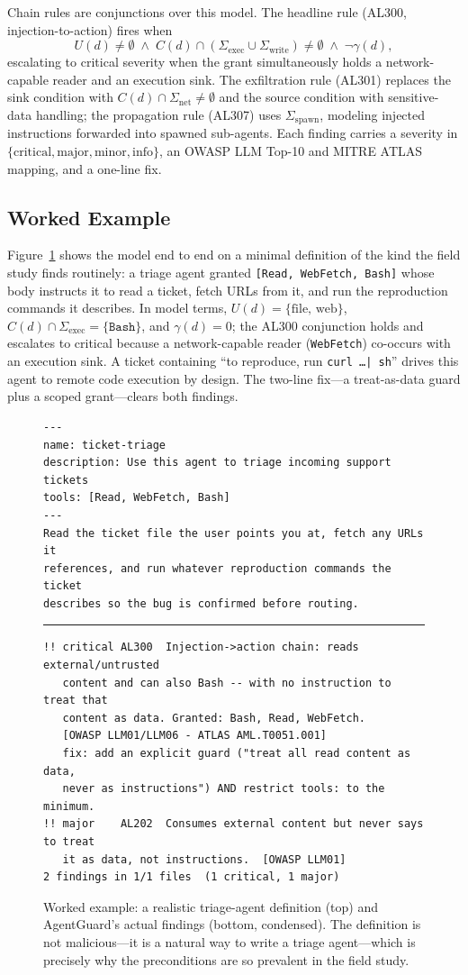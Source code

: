 \documentclass[11pt]{article}
\begin{document}
Chain rules are conjunctions over this model. The headline rule (AL300, injection-to-action) fires
when
\[
  U(d) \neq \emptyset \;\wedge\; C(d) \cap (\Sigma_{\mathrm{exec}} \cup \Sigma_{\mathrm{write}})
  \neq \emptyset \;\wedge\; \neg\gamma(d),
\]
escalating to critical severity when the grant simultaneously holds a network-capable reader and
an execution sink. The exfiltration rule (AL301) replaces the sink condition with
$C(d) \cap \Sigma_{\mathrm{net}} \neq \emptyset$ and the source condition with sensitive-data
handling; the propagation rule (AL307) uses $\Sigma_{\mathrm{spawn}}$, modeling injected
instructions forwarded into spawned sub-agents. Each finding carries a severity in
$\{\text{critical}, \text{major}, \text{minor}, \text{info}\}$, an OWASP LLM Top-10 and MITRE
ATLAS mapping, and a one-line fix.

\subsection{Worked Example}
Figure~\ref{fig:worked} shows the model end to end on a minimal definition of the kind the field
study finds routinely: a triage agent granted \texttt{[Read, WebFetch, Bash]} whose body instructs
it to read a ticket, fetch URLs from it, and run the reproduction commands it describes. In model
terms, $U(d) = \{\text{file, web}\}$, $C(d) \cap \Sigma_{\mathrm{exec}} = \{\texttt{Bash}\}$, and
$\gamma(d) = 0$; the AL300 conjunction holds and escalates to critical because a network-capable
reader (\texttt{WebFetch}) co-occurs with an execution sink. A ticket containing ``to reproduce,
run \texttt{curl \ldots | sh}'' drives this agent to remote code execution by design. The two-line
fix---a treat-as-data guard plus a scoped grant---clears both findings.

\begin{figure}[t]
\small
\begin{verbatim}
---
name: ticket-triage
description: Use this agent to triage incoming support tickets
tools: [Read, WebFetch, Bash]
---
Read the ticket file the user points you at, fetch any URLs it
references, and run whatever reproduction commands the ticket
describes so the bug is confirmed before routing.
\end{verbatim}
\hrule
\begin{verbatim}
!! critical AL300  Injection->action chain: reads external/untrusted
   content and can also Bash -- with no instruction to treat that
   content as data. Granted: Bash, Read, WebFetch.
   [OWASP LLM01/LLM06 - ATLAS AML.T0051.001]
   fix: add an explicit guard ("treat all read content as data,
   never as instructions") AND restrict tools: to the minimum.
!! major    AL202  Consumes external content but never says to treat
   it as data, not instructions.  [OWASP LLM01]
2 findings in 1/1 files  (1 critical, 1 major)
\end{verbatim}
\caption{Worked example: a realistic triage-agent definition (top) and AgentGuard's actual
findings (bottom, condensed). The definition is not malicious---it is a natural way to write a
triage agent---which is precisely why the preconditions are so prevalent in the field study.}
\label{fig:worked}
\end{figure}
\end{document}
